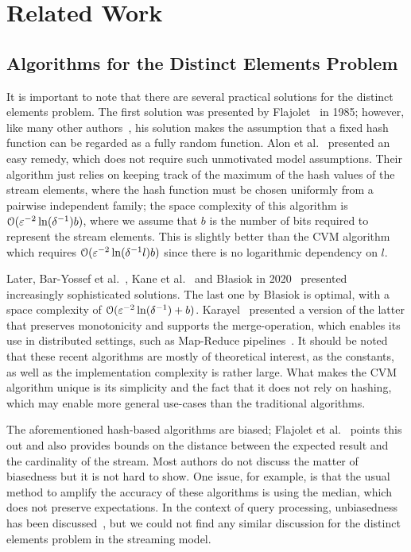 \section{Related Work}\label{sec:related_work}
\subsection{Algorithms for the Distinct Elements Problem}
It is important to note that there are several practical solutions for the distinct elements problem.
The first solution was presented by Flajolet~\cite{flajolet1985} in 1985; however, like many other authors~\cite{flajolet2007,heule2013,pettie2021}, his solution makes the assumption that a fixed hash function can be regarded as a fully random function.
Alon et al.~\cite[Section 2.3]{alon1999} presented an easy remedy, which does not require such unmotivated model assumptions.
Their algorithm just relies on keeping track of the maximum of the hash values of the stream elements, where the hash function must be chosen uniformly from a pairwise independent family; the space complexity of this algorithm is $\operatorname{\mathcal O}(\varepsilon^{-2} \ln (\delta^{-1}) b)$, where we assume that $b$ is the number of bits required to represent the stream elements.
This is slightly better than the CVM algorithm which requires $\operatorname{\mathcal O}(\varepsilon^{-2} \ln (\delta^{-1}l) b)$ since there is no logarithmic dependency on $l$.

Later, Bar-Yossef et al.~\cite{baryossef2002}, Kane et al.~\cite{kane2010} and B\l{}asiok in 2020~\cite{blasiok2020} presented increasingly sophisticated solutions.
The last one by B\l{}asiok is optimal, with a space complexity of $\operatorname{\mathcal O}(\varepsilon^{-2} \ln (\delta^{-1}) + b)$.
Karayel~\cite{karayel2023} presented a version of the latter that preserves monotonicity and supports the merge-operation, which enables its use in distributed settings, such as Map-Reduce pipelines~\cite{dean2010}.
It should be noted that these recent algorithms are mostly of theoretical interest, as the constants, as well as the implementation complexity is rather large.
What makes the CVM algorithm unique is its simplicity and the fact that it does not rely on hashing, which may enable more general use-cases than the traditional algorithms.

The aforementioned hash-based algorithms are biased; Flajolet et al.~\cite{flajolet1985} points this out and also provides bounds on the distance between the expected result and the cardinality of the stream.
Most authors do not discuss the matter of biasedness but it is not hard to show.
One issue, for example, is that the usual method to amplify the accuracy of these algorithms is using the median, which does not preserve expectations.
In the context of query processing, unbiasedness has been discussed~\cite[Section 2.1]{haas1995}, but we could not find any similar discussion for the distinct elements problem in the streaming model.

